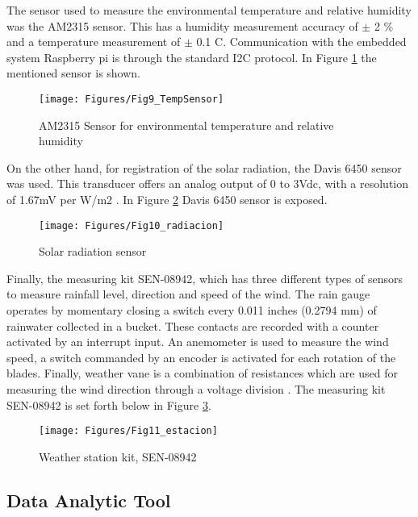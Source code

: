 The sensor used to measure the environmental temperature and relative humidity was the AM2315 sensor. This has a humidity measurement accuracy of $\pm$ 2 \% and a temperature measurement of $\pm$ 0.1 C. Communication with the embedded system Raspberry pi is through the standard I2C protocol. In Figure \ref{ch5_fig:9} the mentioned sensor is shown. 

\begin{figure}[ht!]
\centering
\texttt{[image: Figures/Fig9\_TempSensor]}
\caption{AM2315 Sensor for environmental temperature and relative humidity}
\label{ch5_fig:9}       %
\end{figure}

On the other hand, for registration of the solar radiation, the Davis 6450 sensor was used. This transducer offers an analog output of 0 to 3Vdc, with a resolution of 1.67mV per W/m2 \cite{DavisInstruments2014}. In Figure \ref{ch5_fig:10} Davis 6450 sensor is exposed.

\begin{figure}[ht!]
\centering
\texttt{[image: Figures/Fig10\_radiacion]}
\caption{Solar radiation sensor}
\label{ch5_fig:10}       %
\end{figure}

Finally, the measuring kit SEN-08942, which has three different types of sensors to measure rainfall level, direction and speed of the wind. The rain gauge operates by momentary closing a switch every 0.011 inches (0.2794 mm) of rainwater collected in a bucket. These contacts are recorded with a counter activated by an interrupt input. An anemometer is used to measure the wind speed, a switch commanded by an encoder is activated for each rotation of the blades. Finally, weather vane is a combination of resistances which are used for measuring the wind direction through a voltage division \cite{SparkFunElectronics2009}. The measuring kit SEN-08942 is set forth below in Figure \ref{ch5_fig:11}.

\begin{figure}[ht!]
\centering
\texttt{[image: Figures/Fig11\_estacion]}
\caption{Weather station kit, SEN-08942}
\label{ch5_fig:11}       %
\end{figure}

\subsection{Data Analytic Tool}

